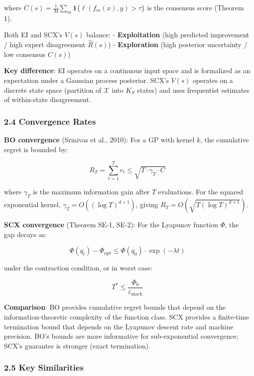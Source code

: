 \documentclass[
  12pt,
]{article}
\begin{document}
where \(C(s) = \frac{1}{M}\sum_m \mathbf{1}\{\ell(f_m(x), y) > \tau\}\)
is the consensus score (Theorem 1).

Both EI and SCX's \(V(s)\) balance: - \textbf{Exploitation} (high
predicted improvement / high expert disagreement \(\hat{R}(s)\)) -
\textbf{Exploration} (high posterior uncertainty / low consensus
\(C(s)\))

\textbf{Key difference}: EI operates on a continuous input space and is
formalized as an expectation under a Gaussian process posterior. SCX's
\(V(s)\) operates on a discrete state space (partition of
\(\mathcal{X}\) into \(K_S\) states) and uses frequentist estimates of
within-state disagreement.

\subsubsection{2.4 Convergence Rates}\label{convergence-rates}

\textbf{BO convergence} (Srinivas et al., 2010): For a GP with kernel
\(k\), the cumulative regret is bounded by:

\[R_T = \sum_{t=1}^T r_t \leq \sqrt{T \cdot \gamma_T \cdot C}\]

where \(\gamma_T\) is the maximum information gain after \(T\)
evaluations. For the squared exponential kernel,
\(\gamma_T = O((\log T)^{d+1})\), giving
\(R_T = O(\sqrt{T (\log T)^{d+1}})\).

\textbf{SCX convergence} (Theorem SE-1, SE-2): For the Lyapunov function
\(\Phi\), the gap decays as:

\[\Phi(q_t) - \Phi_{\text{opt}} \leq \Phi(q_0) \cdot \exp(-\lambda t)\]

under the contraction condition, or in worst case:

\[T^* \leq \frac{\Phi_0}{\varepsilon_{\text{mach}}}\]

\textbf{Comparison}: BO provides cumulative regret bounds that depend on
the information-theoretic complexity of the function class. SCX provides
a finite-time termination bound that depends on the Lyapunov descent
rate and machine precision. BO's bounds are more informative for
sub-exponential convergence; SCX's guarantee is stronger (exact
termination).

\subsubsection{2.5 Key Similarities}\label{key-similarities-1}
\end{document}
